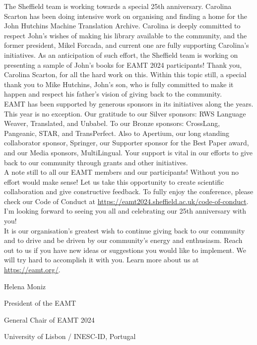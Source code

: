 The Sheffield team is working towards a special 25th anniversary. Carolina Scarton has been doing intensive work on organising and finding a home for the John Hutchins Machine Translation Archive. Carolina is deeply committed to respect John’s wishes of making his library available to the community, and the former president, Mikel Forcada, and current one are fully supporting Carolina’s initiatives. As an anticipation of such effort, the Sheffield team is working on presenting a sample of John’s books for EAMT 2024 participants! Thank you, Carolina Scarton, for all the hard work on this. Within this topic still, a special thank you to Mike Hutchins, John’s son, who is fully committed to make it happen and respect his father’s vision of giving back to the community.
\\

EAMT has been supported by generous sponsors in its initiatives along the years. This year is no exception. Our gratitude to our Silver sponsors: RWS Language Weaver, Translated, and Unbabel. To our Bronze sponsors: CrossLang, Pangeanic, STAR, and TransPerfect. Also to Apertium, our long standing collaborator sponsor, Springer, our Supporter sponsor for the Best Paper award, and our Media sponsors, MultiLingual. Your support is vital in our efforts to give back to our community through grants and other initiatives.
\\

A note still to all our EAMT members and our participants! Without you no effort would make sense! Let us take this opportunity to create scientific collaboration and give constructive feedback. To fully enjoy the conference, please check our Code of Conduct at \url{https://eamt2024.sheffield.ac.uk/code-of-conduct}. I’m looking forward to seeing you all and celebrating our 25th anniversary with you!
\\

It is our organisation's greatest wish to continue giving back to our community and to drive and be driven by our community’s energy and enthusiasm. Reach out to us if you have new ideas or suggestions you would like to implement. We will try hard to accomplish it with you. Learn more about us at \url{https://eamt.org/}.

\bigbreak

Helena Moniz


\bigbreak


President of the EAMT

General Chair of EAMT 2024

University of Lisbon / INESC-ID, Portugal


